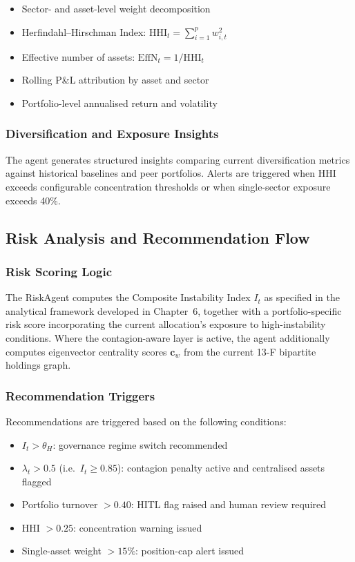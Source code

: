 \documentclass[11pt]{article}
\begin{document}
\begin{itemize}
  \item Sector- and asset-level weight decomposition
  \item Herfindahl--Hirschman Index: $\mathrm{HHI}_t = \sum_{i=1}^p w_{i,t}^2$
  \item Effective number of assets: $\mathrm{EffN}_t = 1 / \mathrm{HHI}_t$
  \item Rolling P\&L attribution by asset and sector
  \item Portfolio-level annualised return and volatility
\end{itemize}

\subsubsection{Diversification and Exposure Insights}

The agent generates structured insights comparing current diversification metrics against historical baselines and peer portfolios. Alerts are triggered when HHI exceeds configurable concentration thresholds or when single-sector exposure exceeds 40\%.

\subsection{Risk Analysis and Recommendation Flow}
\label{sec:risk_flow}

\subsubsection{Risk Scoring Logic}

The RiskAgent computes the Composite Instability Index $I_t$ as specified in the analytical framework developed in Chapter~6, together with a portfolio-specific risk score incorporating the current allocation's exposure to high-instability conditions. Where the contagion-aware layer is active, the agent additionally computes eigenvector centrality scores $\mathbf{c}_w$ from the current 13-F bipartite holdings graph.

\subsubsection{Recommendation Triggers}

Recommendations are triggered based on the following conditions:
\begin{itemize}
  \item $I_t > \theta_H$: governance regime switch recommended
  \item $\lambda_t > 0.5$ (i.e.\ $I_t \geq 0.85$): contagion penalty active and centralised assets flagged
  \item Portfolio turnover $> 0.40$: HITL flag raised and human review required
  \item HHI $> 0.25$: concentration warning issued
  \item Single-asset weight $> 15\%$: position-cap alert issued
\end{itemize}
\end{document}
